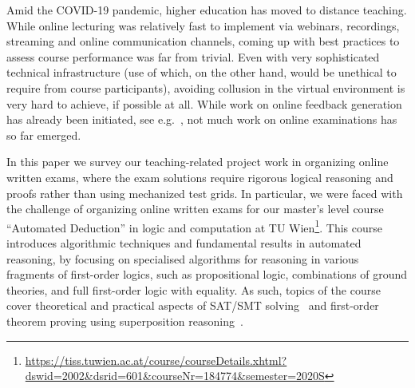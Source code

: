 Amid the COVID-19 pandemic, higher education has moved to distance
teaching. While online lecturing was relatively fast to implement via
webinars, recordings,  streaming and online communication channels,
coming up with best practices to assess course performance was far
from trivial. Even with very sophisticated technical infrastructure
(use of which, on the other hand, would be unethical to require from course
participants), avoiding collusion in the virtual
environment is very hard to achieve, if possible at all.
While work on
online feedback generation has already been initiated, see
e.g.~\cite{Zuleger18,Wang18}, 
not much work on online examinations has so far emerged. 

In this paper we survey our teaching-related project work in organizing online
written exams, where the exam solutions require rigorous
logical reasoning and proofs rather than using mechanized test grids.
In particular, we were faced with the challenge of organizing online
written exams for our master's level course ``Automated
Deduction'' in logic and computation at TU
Wien\footnote{\url{https://tiss.tuwien.ac.at/course/courseDetails.xhtml?dswid=2002\&dsrid=601\&courseNr=184774\&semester=2020S}}.
This course introduces algorithmic techniques and fundamental results
in automated reasoning, by focusing on specialised algorithms for
reasoning in various fragments of first-order logics, such as
propositional logic, combinations of ground theories, and full
first-order logic with equality.
As such, topics of the course cover theoretical and practical
aspects of SAT/SMT solving~\cite{DPLL,Tinelli02,DPLLT} and first-order theorem proving using
superposition reasoning~\cite{Rubio01,Vampire13}.

